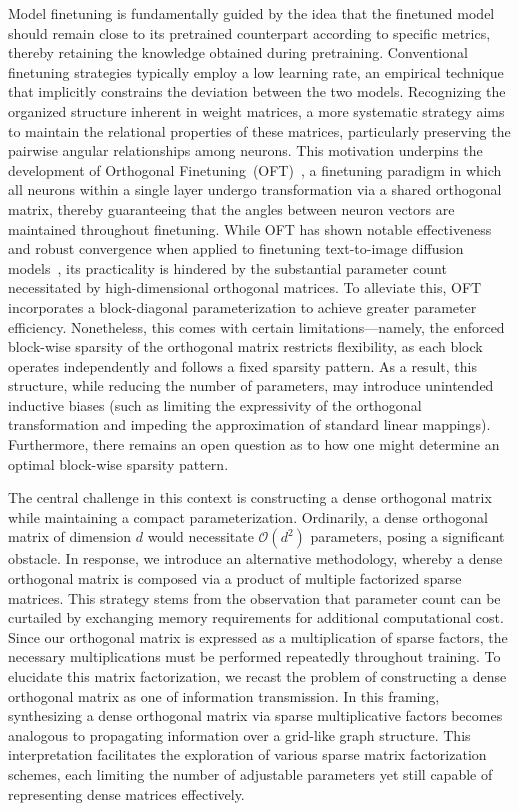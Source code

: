 Model finetuning is fundamentally guided by the idea that the finetuned model should remain close to its pretrained counterpart according to specific metrics, thereby retaining the knowledge obtained during pretraining. Conventional finetuning strategies typically employ a low learning rate, an empirical technique that implicitly constrains the deviation between the two models. Recognizing the organized structure inherent in weight matrices, a more systematic strategy aims to maintain the relational properties of these matrices, particularly preserving the pairwise angular relationships among neurons. This motivation underpins the development of Orthogonal Finetuning~(OFT)~\cite{qiu2023controlling}, a finetuning paradigm in which all neurons within a single layer undergo transformation via a shared orthogonal matrix, thereby guaranteeing that the angles between neuron vectors are maintained throughout finetuning. While OFT has shown notable effectiveness and robust convergence when applied to finetuning text-to-image diffusion models~\cite{qiu2023controlling}, its practicality is hindered by the substantial parameter count necessitated by high-dimensional orthogonal matrices. To alleviate this, OFT incorporates a block-diagonal parameterization to achieve greater parameter efficiency. Nonetheless, this comes with certain limitations—namely, the enforced block-wise sparsity of the orthogonal matrix restricts flexibility, as each block operates independently and follows a fixed sparsity pattern. As a result, this structure, while reducing the number of parameters, may introduce unintended inductive biases (such as limiting the expressivity of the orthogonal transformation and impeding the approximation of standard linear mappings). Furthermore, there remains an open question as to how one might determine an optimal block-wise sparsity pattern.

The central challenge in this context is constructing a dense orthogonal matrix while maintaining a compact parameterization. Ordinarily, a dense orthogonal matrix of dimension $d$ would necessitate $\mathcal{O}(d^2)$ parameters, posing a significant obstacle. In response, we introduce an alternative methodology, whereby a dense orthogonal matrix is composed via a product of multiple factorized sparse matrices. This strategy stems from the observation that parameter count can be curtailed by exchanging memory requirements for additional computational cost. Since our orthogonal matrix is expressed as a multiplication of sparse factors, the necessary multiplications must be performed repeatedly throughout training. To elucidate this matrix factorization, we recast the problem of constructing a dense orthogonal matrix as one of information transmission. In this framing, synthesizing a dense orthogonal matrix via sparse multiplicative factors becomes analogous to propagating information over a grid-like graph structure. This interpretation facilitates the exploration of various sparse matrix factorization schemes, each limiting the number of adjustable parameters yet still capable of representing dense matrices effectively.

